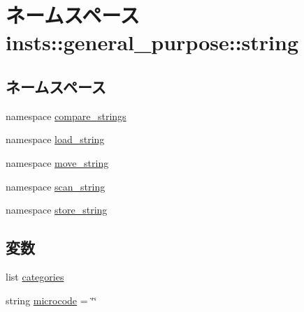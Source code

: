 \hypertarget{namespaceinsts_1_1general__purpose_1_1string}{
\section{ネームスペース insts::general\_\-purpose::string}
\label{namespaceinsts_1_1general__purpose_1_1string}
}
\subsection*{ネームスペース}
\begin{DoxyCompactItemize}
\item 
namespace \hyperlink{namespaceinsts_1_1general__purpose_1_1string_1_1compare__strings}{compare\_\-strings}
\item 
namespace \hyperlink{namespaceinsts_1_1general__purpose_1_1string_1_1load__string}{load\_\-string}
\item 
namespace \hyperlink{namespaceinsts_1_1general__purpose_1_1string_1_1move__string}{move\_\-string}
\item 
namespace \hyperlink{namespaceinsts_1_1general__purpose_1_1string_1_1scan__string}{scan\_\-string}
\item 
namespace \hyperlink{namespaceinsts_1_1general__purpose_1_1string_1_1store__string}{store\_\-string}
\end{DoxyCompactItemize}
\subsection*{変数}
\begin{DoxyCompactItemize}
\item 
list \hyperlink{namespaceinsts_1_1general__purpose_1_1string_a273cf0f1630af14c1582f05e53354a55}{categories}
\item 
string \hyperlink{namespaceinsts_1_1general__purpose_1_1string_a770f11a173e99389a8802f0107ed8f52}{microcode} = \char`\"{}\char`\"{}
\end{DoxyCompactItemize}


